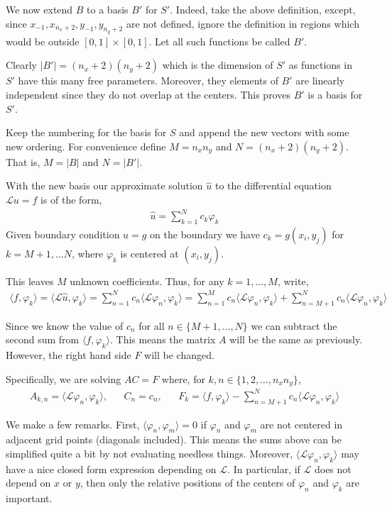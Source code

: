 \documentclass[10pt]{article}
\begin{document}
\begin{solution}[Solution]
We now extend \( B \) to a basis \( B' \) for \( S' \). Indeed, take the above definition, except, since \( x_{-1}, x_{n_x+2}, y_{-1}, y_{n_y+2} \) are not defined, ignore the definition in regions which would be outside \( [0,1]\times[0,1] \). Let all such functions be called \( B' \).


Clearly \( |B'| = (n_x+2)(n_y+2) \) which is the dimension of \( S' \) as functions in \( S' \) have this many free parameters. Moreover, they elements of \( B' \) are linearly independent since they do not overlap at the centers.
This proves \( B' \) is a basis for \( S' \).

Keep the numbering for the basis for \( S \) and append the new vectors with some new ordering. For convenience define \( M = n_xn_y \) and \( N = (n_x+2)(n_y+2) \). That is, \( M = |B| \) and \( N = |B'| \).

With the new basis our approximate solution \( \hat{u} \) to the differential equation \( \mathcal{L}u=f \) is of the form,
\begin{align*}
    \hat{u} = \sum_{k=1}^{N} c_k \varphi_k
\end{align*}
Given boundary condition \( u=g \) on the boundary we have \( c_k = g(x_i,y_j) \) for \( k=M+1,\ldots N\), where \( \varphi_k \) is centered at \( (x_i,y_j) \).

This leaves \( M \) unknown coefficients. Thus, for any \( k=1,...,M \), write,
\begin{align*}
    \langle f, \varphi_k \rangle = \langle \mathcal{L} \hat{u} , \varphi_k \rangle 
    = \sum_{n=1}^{N} c_n\langle \mathcal{L}\varphi_n,\varphi_k \rangle
    = \sum_{n=1}^{M} c_n\langle \mathcal{L}\varphi_n,\varphi_k \rangle
    + \sum_{n=M+1}^{N} c_n\langle \mathcal{L}\varphi_n,\varphi_k \rangle
\end{align*}

Since we know the value of \( c_n \) for all \( n\in\{M+1, \ldots, N\} \) we can subtract the second sum from \( \langle f,\varphi_k \rangle \). This means the matrix \( A \) will be the same as previously. However, the right hand side \( F \) will be changed.

Specifically, we are solving \( AC = F \) where, for \( k,n\in\{1,2,\ldots, n_xn_y\} \),
\begin{align*}
    A_{k,n} = \langle \mathcal{L} \varphi_n, \varphi_k \rangle, && C_n = c_n, &&
    F_{k} = \langle f, \varphi_k \rangle - \sum_{n=M+1}^{N} c_n \langle \mathcal{L} \varphi_n, \varphi_k\rangle
\end{align*}

We make a few remarks. First, \( \langle \varphi_n,\varphi_m \rangle = 0 \) if \( \varphi_n \) and \( \varphi_m \) are not centered in adjacent grid points (diagonals included). This means the sums above can be simplified quite a bit by not evaluating needless things. Moreover, \( \langle \mathcal{L} \varphi_n, \varphi_k \rangle \) may have a nice closed form expression depending on \( \mathcal{L} \). In particular, if \( \mathcal{L} \) does not depend on \( x \) or \( y \), then only the relative positions of the centers of \( \varphi_n \) and \( \varphi_k \) are important.


\end{solution}
\end{document}

